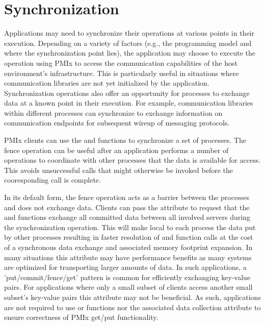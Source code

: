 \chapter{Synchronization}
\label{chap:api_sync}

Applications may need to synchronize their operations at various points in
their execution. Depending on a variety of factors (e.g., the programming
model and where the synchronization point lies), the application may choose to
execute the operation using \ac{PMIx} to access the communication capabilities
of the host environment's infrastructure. This is particularly useful in
situations where communication libraries are not yet initialized by the application.
Synchronization operations also offer an opportunity for processes to exchange
data at a known point in their execution.  For example, communication libraries within
different processes can synchronize to exchange information on communication endpoints
for subsequent wireup of messaging protocols.

\ac{PMIx} clients can use the  and  functions
to synchronize a set of processes.  The fence operation can be useful after an application
performs a number of  operations to coordinate with other processes that the
data is available for access.   This avoids unsuccessful  calls that might
otherwise be invoked before the cooresponding  call is complete.

In its default form, the fence operation acts as a barrier between the processes and does not exchange data.
Clients can pass the  attribute to request
that the  and  functions exchange all committed
data between all involved servers during the synchronization operation.
This will make local to each process the data put by other processes resulting
in faster resolution of  and  function calls at
the cost of a synchronous data exchange and associated memory footprint expansion.
In many situations
this attribute may have performance benefits as many systems are optimized for transporting
larger amounts of data.  In such applications, a 'put/commit/fence/get'
pattern is common for efficiently exchanging key-value pairs.
For applications where only a small subset of clients access another small subset's key-value pairs
this attribute may not be beneficial.  As such, applications are not required to use
 or  functions nor the associated data collection
attribute to ensure correctness of \ac{PMIx} get/put functionality.

